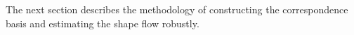 The next section describes the methodology of constructing the correspondence basis and estimating the shape flow robustly.



